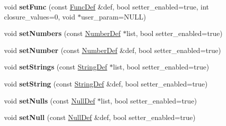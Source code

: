 \begin{DoxyCompactItemize}
\item 
void {\bfseries set\+Func} (const \hyperlink{struct_object_script_1_1_o_s_1_1_func_def}{Func\+Def} \&def, bool setter\+\_\+enabled=true, int closure\+\_\+values=0, void $\ast$user\+\_\+param=N\+U\+LL)\hypertarget{class_object_script_1_1_o_s_a858bb9bd2e622cc2efa3742471832e5d}{}\label{class_object_script_1_1_o_s_a858bb9bd2e622cc2efa3742471832e5d}

\item 
void {\bfseries set\+Numbers} (const \hyperlink{struct_object_script_1_1_o_s_1_1_number_def}{Number\+Def} $\ast$list, bool setter\+\_\+enabled=true)\hypertarget{class_object_script_1_1_o_s_ac3ac473bde563254ea212aa6ce96ad78}{}\label{class_object_script_1_1_o_s_ac3ac473bde563254ea212aa6ce96ad78}

\item 
void {\bfseries set\+Number} (const \hyperlink{struct_object_script_1_1_o_s_1_1_number_def}{Number\+Def} \&def, bool setter\+\_\+enabled=true)\hypertarget{class_object_script_1_1_o_s_ae644c1ce99b1204ba33fb803dc061f70}{}\label{class_object_script_1_1_o_s_ae644c1ce99b1204ba33fb803dc061f70}

\item 
void {\bfseries set\+Strings} (const \hyperlink{struct_object_script_1_1_o_s_1_1_string_def}{String\+Def} $\ast$list, bool setter\+\_\+enabled=true)\hypertarget{class_object_script_1_1_o_s_ab05333fe94b44049519cb37dc4d0769a}{}\label{class_object_script_1_1_o_s_ab05333fe94b44049519cb37dc4d0769a}

\item 
void {\bfseries set\+String} (const \hyperlink{struct_object_script_1_1_o_s_1_1_string_def}{String\+Def} \&def, bool setter\+\_\+enabled=true)\hypertarget{class_object_script_1_1_o_s_a13ce0dcd6bf3a7ca08c6def6ad7bfaca}{}\label{class_object_script_1_1_o_s_a13ce0dcd6bf3a7ca08c6def6ad7bfaca}

\item 
void {\bfseries set\+Nulls} (const \hyperlink{struct_object_script_1_1_o_s_1_1_null_def}{Null\+Def} $\ast$list, bool setter\+\_\+enabled=true)\hypertarget{class_object_script_1_1_o_s_a3a2716d9c2e1c87ca516f80d21876043}{}\label{class_object_script_1_1_o_s_a3a2716d9c2e1c87ca516f80d21876043}

\item 
void {\bfseries set\+Null} (const \hyperlink{struct_object_script_1_1_o_s_1_1_null_def}{Null\+Def} \&def, bool setter\+\_\+enabled=true)\hypertarget{class_object_script_1_1_o_s_a0f0c1a7cd369047fc966d3146c04cb3e}{}\label{class_object_script_1_1_o_s_a0f0c1a7cd369047fc966d3146c04cb3e}


\end{DoxyCompactItemize}
